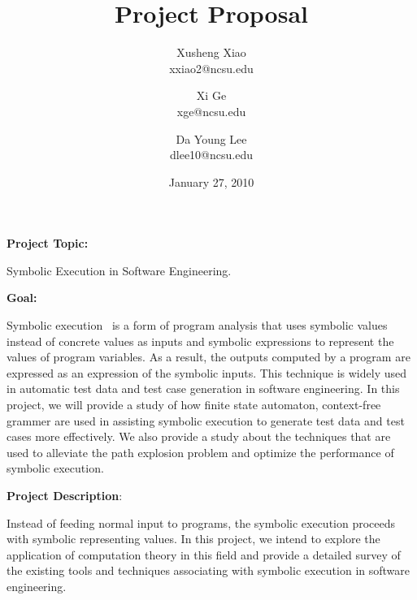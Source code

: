 \documentclass[times, 10pt,onecolumn]{article}
\title{Project Proposal}
\author{
Xusheng Xiao\\
\small{xxiao2@ncsu.edu}\\
\and
Xi Ge\\
\small{xge@ncsu.edu}\\
\and
Da Young Lee\\
\small{dlee10@ncsu.edu}
}
\date{January 27, 2010}
\begin{document}
\maketitle

\begin{flushleft}
\textbf{Project Topic:}\end{flushleft} Symbolic Execution in Software Engineering.\\

\begin{flushleft}
\textbf{Goal:}\end{flushleft}
Symbolic execution~\cite{static} is a form of program analysis that uses symbolic values instead of concrete values as inputs and symbolic expressions to represent the values of program variables. As a result, the outputs computed by a program are expressed as an expression of the symbolic inputs. This technique is widely used in automatic test data and test case generation in software engineering. In this project, we will provide a study of how finite state automaton, context-free grammer are used in assisting symbolic execution to generate test data and test cases more effectively. We also provide a study about the techniques that are used to alleviate the path explosion problem and optimize the performance of symbolic execution. 
\\

\begin{flushleft}
\textbf{Project Description}:\end{flushleft}
Instead of feeding normal input to programs, the symbolic execution proceeds with symbolic representing values\cite{symbolic}. In this project, we intend to explore the application of computation theory in this field and provide a detailed survey of the existing tools and techniques associating with symbolic execution in software engineering. 
\end{document}
